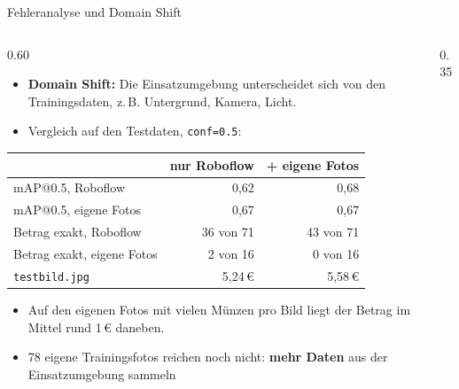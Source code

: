\begin{frame}{Fehleranalyse und Domain Shift}
\footnotesize
\begin{columns}
\begin{column}{0.60\textwidth}
\begin{itemize}
  \item \textbf{Domain Shift:} Die Einsatzumgebung unterscheidet sich von den Trainingsdaten, z.\,B. Untergrund, Kamera, Licht.
  \item Vergleich auf den Testdaten, \texttt{conf=0.5}:
\end{itemize}
\centering
\begin{tabular}{lrr}
\toprule
 & \textbf{nur Roboflow} & \textbf{+ eigene Fotos} \\
\midrule
mAP@0.5, Roboflow & 0,62 & 0,68 \\
mAP@0.5, eigene Fotos & 0,67 & 0,67 \\
Betrag exakt, Roboflow & 36 von 71 & 43 von 71 \\
Betrag exakt, eigene Fotos & 2 von 16 & 0 von 16 \\
\texttt{testbild.jpg} & 5,24\,€ & 5,58\,€ \\
\bottomrule
\end{tabular}
\begin{itemize}
  \item Auf den eigenen Fotos mit vielen Münzen pro Bild liegt der Betrag im Mittel rund 1\,€ daneben.
  \item 78 eigene Trainingsfotos reichen noch nicht: \textbf{mehr Daten} aus der Einsatzumgebung sammeln
\end{itemize}
\end{column}
\begin{column}{0.35\textwidth}
\centering
{}
\end{column}
\end{columns}
\end{frame}

